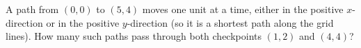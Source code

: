 A path from $(0,0)$ to $(5,4)$ moves one unit at a time, either in the positive $x$-direction or in the positive $y$-direction (so it is a shortest path along the grid lines). How many such paths pass through both checkpoints $(1,2)$ and $(4,4)$?
